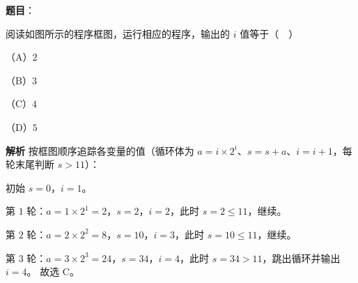\begin{answer}

\textbf{题目}：

阅读如图所示的程序框图，运行相应的程序，输出的 $i$ 值等于（　）

（A）$2$

（B）$3$

（C）$4$

（D）$5$
\nopagebreak[4]
\begin{center}\end{center}
\nopagebreak[4]
\textbf{解析}
按框图顺序追踪各变量的值（循环体为 $a=i\times2^i$、$s=s+a$、$i=i+1$，每轮末尾判断 $s>11$）：

初始 $s=0$，$i=1$。

第 $1$ 轮：$a=1\times2^1=2$，$s=2$，$i=2$，此时 $s=2\leqslant11$，继续。

第 $2$ 轮：$a=2\times2^2=8$，$s=10$，$i=3$，此时 $s=10\leqslant11$，继续。

第 $3$ 轮：$a=3\times2^3=24$，$s=34$，$i=4$，此时 $s=34>11$，跳出循环并输出 $i=4$。
故选 C。


\end{answer}
